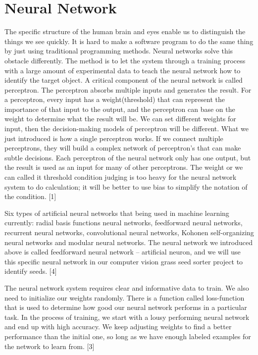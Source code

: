 \documentclass[onecolumn, draftclsnofoot,10pt, compsoc]{IEEEtran}
\begin{document}
\section{Neural Network}
\par
The specific structure of the human brain and eyes enable us to distinguish the things we see quickly. It is hard to make a software program to do the same thing by just using traditional programming methods. Neural networks solve this obstacle differently. The method is to let the system through a training process with a large amount of experimental data to teach the neural network how to identify the target object. A critical component of the neural network is called perceptron. The perceptron absorbs multiple inputs and generates the result. For a perceptron, every input has a weight(threshold) that can represent the importance of that input to the output, and the perceptron can base on the weight to determine what the result will be. We can set different weights for input, then the decision-making models of perceptron will be different. What we just introduced is how a single perceptron works. If we connect multiple perceptrons, they will build a complex network of perceptron's that can make subtle decisions.  Each perceptron of the neural network only has one output, but the result is used as an input for many of other perceptrons. The weight or we can called it threshold condition judging is too heavy for the neural network system to do calculation; it will be better to use bias to simplify the notation of the condition. [1]
\par
Six types of artificial neural networks that being used in machine learning currently: radial basis functions neural networks, feedforward neural networks, recurrent neural networks, convolutional neural networks, Kohonen self-organizing neural networks and modular neural networks. The neural network we introduced above is called feedforward neural network – artificial neuron, and we will use this specific neural network in our computer vision grass seed sorter project to identify seeds.  [4]
\par
The neural network system requires clear and informative data to train.  We also need to initialize our weights randomly. There is a function called loss-function that is used to determine how good our neural network performs in a particular task. In the process of training, we start with a lousy performing neural network and end up with high accuracy. We keep adjusting weights to find a better performance than the initial one, so long as we have enough labeled examples for the network to learn from.  [3]
\end{document}
